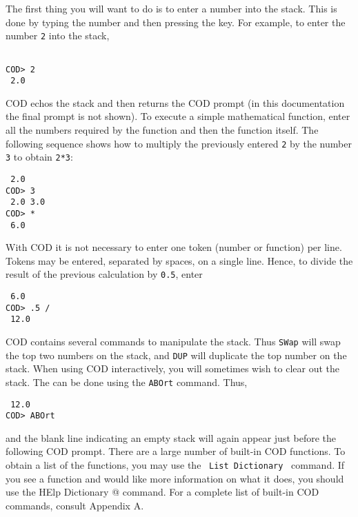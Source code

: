 The first thing you will want to do is to enter a number into the stack.
This is done by typing the number and then pressing the  key.
For example, to enter the number {\tt 2} into the stack,
\begin{verbatim}

COD> 2
 2.0
\end{verbatim}
COD echos the stack and then returns the COD prompt (in this documentation
the final prompt is not shown).
To execute a simple mathematical function, enter
all the numbers required by the function
and then the function itself.
The following sequence shows how to multiply the previously entered {\tt 2}
by the number {\tt 3} to obtain {\tt 2*3}:
\begin{verbatim}
 2.0
COD> 3
 2.0 3.0
COD> *
 6.0
\end{verbatim}
With COD it is not necessary
to enter one token (number or function) per line.
Tokens may be entered, separated by spaces, on a single line.
Hence, to divide the result of the previous calculation by {\tt 0.5},
enter
\begin{verbatim}
 6.0
COD> .5 /
 12.0
\end{verbatim}
COD contains several commands to manipulate the stack.
Thus {\tt SWap} will swap the top two numbers on the stack,
and {\tt DUP} will duplicate the top number on the stack.
When using COD interactively,
you will sometimes wish to clear out the stack.
The can be done using the {\tt ABOrt} command.
Thus,
\begin{verbatim}
 12.0
COD> ABOrt

\end{verbatim}
and the blank line indicating an empty stack will again appear just
before the following COD prompt.
There are a large number of built-in COD functions.
To obtain a list of the functions,
you may use the \, {\tt List~Dictionary} \, command.
If you see a function and would like more information on what it does,
you should use the \verb@ HElp Dictionary @ command.
For a complete list of built-in COD commands,
consult Appendix A.

